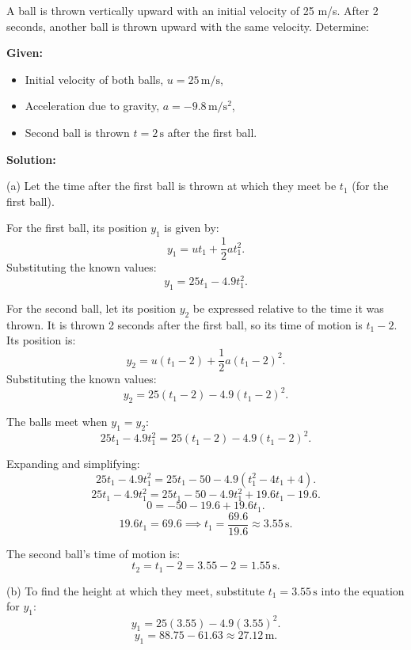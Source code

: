 \documentclass[addpoints]{exam}
\begin{document}
\begin{questions}
\question A ball is thrown vertically upward with an initial velocity of 25 m/s. After 2 seconds, another ball is thrown upward with the same velocity. Determine:
\begin{solution}[8cm]
    \textbf{Given:}
\begin{itemize}
    \item Initial velocity of both balls, \(u = 25 \, \mathrm{m/s}\),
    \item Acceleration due to gravity, \(a = -9.8 \, \mathrm{m/s^2}\),
    \item Second ball is thrown \(t = 2 \, \mathrm{s}\) after the first ball.
\end{itemize}

\textbf{Solution:}

(a) Let the time after the first ball is thrown at which they meet be \(t_1\) (for the first ball). 

For the first ball, its position \(y_1\) is given by:
\[
y_1 = ut_1 + \frac{1}{2}at_1^2.
\]
Substituting the known values:
\[
y_1 = 25t_1 - 4.9t_1^2.
\]

For the second ball, let its position \(y_2\) be expressed relative to the time it was thrown. It is thrown 2 seconds after the first ball, so its time of motion is \(t_1 - 2\). Its position is:
\[
y_2 = u(t_1 - 2) + \frac{1}{2}a(t_1 - 2)^2.
\]
Substituting the known values:
\[
y_2 = 25(t_1 - 2) - 4.9(t_1 - 2)^2.
\]

The balls meet when \(y_1 = y_2\):
\[
25t_1 - 4.9t_1^2 = 25(t_1 - 2) - 4.9(t_1 - 2)^2.
\]

Expanding and simplifying:
\[
25t_1 - 4.9t_1^2 = 25t_1 - 50 - 4.9(t_1^2 - 4t_1 + 4).
\]
\[
25t_1 - 4.9t_1^2 = 25t_1 - 50 - 4.9t_1^2 + 19.6t_1 - 19.6.
\]
\[
0 = -50 - 19.6 + 19.6t_1.
\]
\[
19.6t_1 = 69.6 \implies t_1 = \frac{69.6}{19.6} \approx 3.55 \, \mathrm{s}.
\]

The second ball's time of motion is:
\[
t_2 = t_1 - 2 = 3.55 - 2 = 1.55 \, \mathrm{s}.
\]

(b) To find the height at which they meet, substitute \(t_1 = 3.55 \, \mathrm{s}\) into the equation for \(y_1\):
\[
y_1 = 25(3.55) - 4.9(3.55)^2.
\]
\[
y_1 = 88.75 - 61.63 \approx 27.12 \, \mathrm{m}.
\]


\end{solution}
\end{questions}
\end{document}
